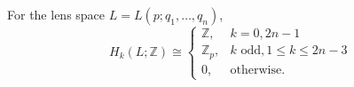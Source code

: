 For the lens space $L = L(p; q_1, \ldots, q_n)$,
$$H_k(L; \mathbb{Z}) \cong \begin{cases} \mathbb{Z}, & k = 0, 2n-1 \\ \mathbb{Z}_p, & k \text{ odd}, 1 \leq k \leq 2n-3 \\ 0, & \text{otherwise}. \end{cases}$$
